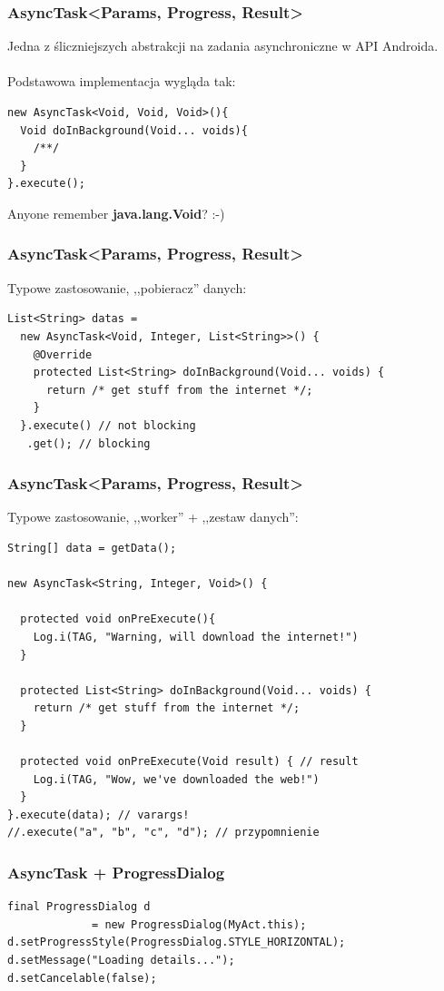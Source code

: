 \documentclass{beamer}
\begin{document}
\begin{frame}[fragile]\frametitle{AsyncTask<Params, Progress, Result>}
Jedna z śliczniejszych abstrakcji na zadania asynchroniczne w API Androida.\\
\ \\
Podstawowa implementacja wygląda tak:

\begin{lstlisting}
new AsyncTask<Void, Void, Void>(){
  Void doInBackground(Void... voids){
    /**/
  }
}.execute();
\end{lstlisting}

\pause

Anyone remember \textbf{java.lang.Void}? :-)

\end{frame}


\begin{frame}[fragile]\frametitle{AsyncTask<Params, Progress, Result>}
Typowe zastosowanie, ,,pobieracz'' danych:
\begin{lstlisting}
List<String> datas = 
  new AsyncTask<Void, Integer, List<String>>() {
    @Override
    protected List<String> doInBackground(Void... voids) {
      return /* get stuff from the internet */;
    }
  }.execute() // not blocking
   .get(); // blocking
\end{lstlisting}
\end{frame}

\begin{frame}[fragile]\frametitle{AsyncTask<Params, Progress, Result>}
Typowe zastosowanie, ,,worker'' + ,,zestaw danych'':
\begin{lstlisting}
String[] data = getData();

new AsyncTask<String, Integer, Void>() {

  protected void onPreExecute(){
    Log.i(TAG, "Warning, will download the internet!")
  }

  protected List<String> doInBackground(Void... voids) {
    return /* get stuff from the internet */;
  }

  protected void onPreExecute(Void result) { // result
    Log.i(TAG, "Wow, we've downloaded the web!")
  }
}.execute(data); // varargs!
//.execute("a", "b", "c", "d"); // przypomnienie
\end{lstlisting}
\end{frame}

\begin{frame}[fragile]\frametitle{AsyncTask + ProgressDialog}
\begin{lstlisting}
final ProgressDialog d
             = new ProgressDialog(MyAct.this);
d.setProgressStyle(ProgressDialog.STYLE_HORIZONTAL);
d.setMessage("Loading details...");
d.setCancelable(false);
\end{lstlisting}
\end{frame}
\end{document}
